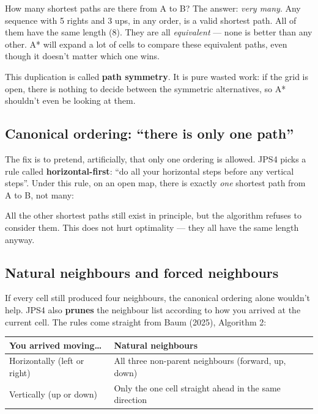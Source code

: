 \documentclass[11pt,a4paper]{article}
\newcommand{\gridbase}[2]{%
  \draw[step=0.6,gray!50,very thin] (0,0) grid (#1*0.6,#2*0.6);
  \draw[black,thick] (0,0) rectangle (#1*0.6,#2*0.6);
}
\newcommand{\fillcell}[3]{%
  \fill[#3] (#1*0.6,#2*0.6) rectangle ({(#1+1)*0.6},{(#2+1)*0.6});
  \draw[gray!50,very thin] (#1*0.6,#2*0.6) rectangle ({(#1+1)*0.6},{(#2+1)*0.6});
}
\newcommand{\celltext}[3]{%
  \node at ({(#1+0.5)*0.6},{(#2+0.5)*0.6}) {\footnotesize #3};
}
\begin{document}
\noindent How many shortest paths are there from A to B? The answer: \emph{very many}. Any sequence with 5 rights and 3 ups, in any order, is a valid shortest path. All of them have the same length (8). They are all \textit{equivalent} --- none is better than any other. A* will expand a lot of cells to compare these equivalent paths, even though it doesn't matter which one wins.

This duplication is called \textbf{path symmetry}. It is pure wasted work: if the grid is open, there is nothing to decide between the symmetric alternatives, so A* shouldn't even be looking at them.

\subsection{Canonical ordering: ``there is only one path''}

The fix is to pretend, artificially, that only one ordering is allowed. JPS4 picks a rule called \textbf{horizontal-first}: ``do all your horizontal steps before any vertical steps''. Under this rule, on an open map, there is exactly \emph{one} shortest path from A to B, not many:

\begin{center}
\end{center}

\noindent All the other shortest paths still exist in principle, but the algorithm refuses to consider them. This does not hurt optimality --- they all have the same length anyway.

\subsection{Natural neighbours and forced neighbours}

If every cell still produced four neighbours, the canonical ordering alone wouldn't help. JPS4 also \textbf{prunes} the neighbour list according to how you arrived at the current cell. The rules come straight from Baum (2025), Algorithm 2:

\begin{center}
\renewcommand{\arraystretch}{1.25}
\begin{tabular}{@{}ll@{}}
\toprule
\textbf{You arrived moving\ldots} & \textbf{Natural neighbours} \\
\midrule
Horizontally (left or right) & All three non-parent neighbours (forward, up, down) \\
Vertically (up or down)      & Only the one cell straight ahead in the same direction \\
\bottomrule
\end{tabular}
\end{center}
\end{document}
